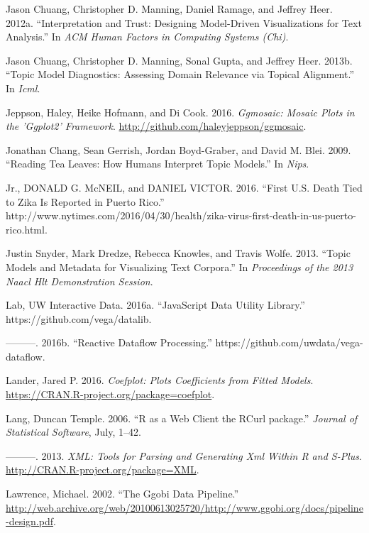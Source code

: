 \documentclass[12pt,]{isuthesis}
\begin{document}
\hypertarget{ref-2012-trust}{}
Jason Chuang, Christopher D. Manning, Daniel Ramage, and Jeffrey Heer.
2012a. ``Interpretation and Trust: Designing Model-Driven Visualizations
for Text Analysis.'' In \emph{ACM Human Factors in Computing Systems
(Chi)}.

\hypertarget{ref-2013-diagnostics}{}
Jason Chuang, Christopher D. Manning, Sonal Gupta, and Jeffrey Heer.
2013b. ``Topic Model Diagnostics: Assessing Domain Relevance via Topical
Alignment.'' In \emph{Icml}.

\hypertarget{ref-ggmosaic}{}
Jeppson, Haley, Heike Hofmann, and Di Cook. 2016. \emph{Ggmosaic: Mosaic
Plots in the 'Ggplot2' Framework}.
\url{http://github.com/haleyjeppson/ggmosaic}.

\hypertarget{ref-Chang}{}
Jonathan Chang, Sean Gerrish, Jordan Boyd-Graber, and David M. Blei.
2009. ``Reading Tea Leaves: How Humans Interpret Topic Models.'' In
\emph{Nips}.

\hypertarget{ref-zika-nyt}{}
Jr., DONALD G. McNEIL, and DANIEL VICTOR. 2016. ``First U.S. Death Tied
to Zika Is Reported in Puerto Rico.''
http://www.nytimes.com/2016/04/30/health/zika-virus-first-death-in-us-puerto-rico.html.

\hypertarget{ref-Snyder}{}
Justin Snyder, Mark Dredze, Rebecca Knowles, and Travis Wolfe. 2013.
``Topic Models and Metadata for Visualizing Text Corpora.'' In
\emph{Proceedings of the 2013 Naacl Hlt Demonstration Session}.

\hypertarget{ref-datalib}{}
Lab, UW Interactive Data. 2016a. ``JavaScript Data Utility Library.''
https://github.com/vega/datalib.

\hypertarget{ref-vega-dataflow}{}
---------. 2016b. ``Reactive Dataflow Processing.''
https://github.com/uwdata/vega-dataflow.

\hypertarget{ref-coefplot}{}
Lander, Jared P. 2016. \emph{Coefplot: Plots Coefficients from Fitted
Models}. \url{https://CRAN.R-project.org/package=coefplot}.

\hypertarget{ref-Lang:2006us}{}
Lang, Duncan Temple. 2006. ``R as a Web Client the RCurl package.''
\emph{Journal of Statistical Software}, July, 1--42.

\hypertarget{ref-XML}{}
---------. 2013. \emph{XML: Tools for Parsing and Generating Xml Within
R and S-Plus}. \url{http://CRAN.R-project.org/package=XML}.

\hypertarget{ref-ggobi-pipeline-design}{}
Lawrence, Michael. 2002. ``The Ggobi Data Pipeline.''
\url{http://web.archive.org/web/20100613025720/http://www.ggobi.org/docs/pipeline-design.pdf}.
\end{document}
